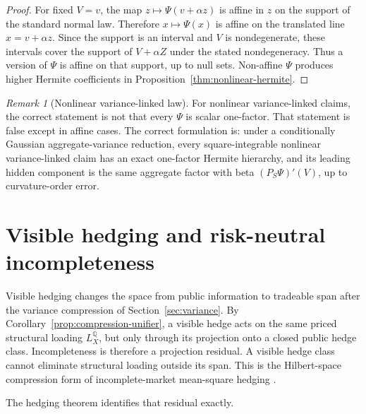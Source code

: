 \documentclass[11pt,a4paper]{amsart}
\theoremstyle{plain}
\theoremstyle{definition}
\theoremstyle{remark}
\newtheorem{remark}[theorem]{Remark}
\newcommand{\QQ}{\mathbb{Q}}
\begin{document}
\begin{proof}
For fixed \(V=v\), the map \(z\mapsto\Psi(v+\alpha z)\) is affine in \(z\) on the support of the
standard normal law.  Therefore \(x\mapsto\Psi(x)\) is affine on the translated line
\(x=v+\alpha z\).  Since the support is an interval and \(V\) is nondegenerate, these intervals
cover the support of \(V+\alpha Z\) under the stated nondegeneracy.  Thus a version of \(\Psi\) is affine on that support, up to null sets.  Non-affine
\(\Psi\) produces higher Hermite coefficients in Proposition~\ref{thm:nonlinear-hermite}.
\end{proof}

\begin{remark}[Nonlinear variance-linked law]\label{rem:nonlinear-hermite-headline}
For nonlinear variance-linked claims, the correct statement is not that every \(\Psi\) is scalar
one-factor.  That statement is false except in affine cases.  The correct formulation is: under a
conditionally Gaussian aggregate-variance reduction, every square-integrable nonlinear
variance-linked claim has an exact one-factor Hermite hierarchy, and its leading hidden component
is the same aggregate factor with beta \((P_S\Psi)'(V)\), up to curvature-order error.
\end{remark}

\section{Visible hedging and risk-neutral incompleteness}\label{sec:hedging}

\noindent
Visible hedging changes the space from public information to tradeable span after the variance compression of Section~\ref{sec:variance}.  By
Corollary~\ref{prop:compression-unifier}, a visible hedge acts on the same priced structural loading
\(L_X^\QQ\), but only through its projection onto a closed public hedge class.  Incompleteness is
therefore a projection residual.  A visible hedge class cannot eliminate structural loading outside
its span.  This is the Hilbert-space compression form of incomplete-market mean-square hedging
\cite{follmerSondermann1986,follmerSchweizer1991,schweizer1992meanVariance,
schweizer1995minimal,karatzasShreve1998}.

The hedging theorem identifies that residual exactly.
\end{document}
